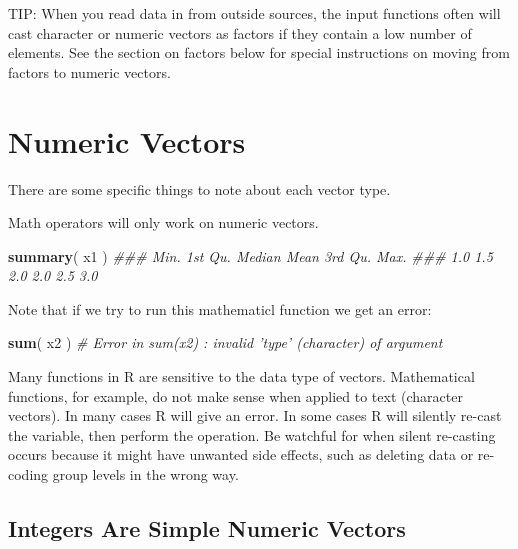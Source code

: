 \documentclass[]{book}
\newenvironment{Shaded}{\begin{snugshade}}{\end{snugshade}}
\newcommand{\CommentTok}[1]{\textcolor[rgb]{0.56,0.35,0.01}{\textit{#1}}}
\newcommand{\KeywordTok}[1]{\textcolor[rgb]{0.13,0.29,0.53}{\textbf{#1}}}
\newcommand{\NormalTok}[1]{#1}
\theoremstyle{definition}
\theoremstyle{definition}
\theoremstyle{definition}
\theoremstyle{remark}
\begin{document}
TIP: When you read data in from outside sources, the input functions
often will cast character or numeric vectors as factors if they contain
a low number of elements. See the section on factors below for special
instructions on moving from factors to numeric vectors.

\hypertarget{numeric-vectors}{%
\section{Numeric Vectors}\label{numeric-vectors}}

There are some specific things to note about each vector type.

Math operators will only work on numeric vectors.

\begin{Shaded}
\begin{Highlighting}[]

\KeywordTok{summary}\NormalTok{( x1 )}
\CommentTok{###    Min. 1st Qu.  Median    Mean 3rd Qu.    Max. }
\CommentTok{###     1.0     1.5     2.0     2.0     2.5     3.0}
\end{Highlighting}
\end{Shaded}

Note that if we try to run this mathematicl function we get an error:

\begin{Shaded}
\begin{Highlighting}[]

\KeywordTok{sum}\NormalTok{( x2 ) }\CommentTok{# Error in sum(x2) : invalid 'type' (character) of argument}
\end{Highlighting}
\end{Shaded}

Many functions in R are sensitive to the data type of vectors.
Mathematical functions, for example, do not make sense when applied to
text (character vectors). In many cases R will give an error. In some
cases R will silently re-cast the variable, then perform the operation.
Be watchful for when silent re-casting occurs because it might have
unwanted side effects, such as deleting data or re-coding group levels
in the wrong way.

\hypertarget{integers-are-simple-numeric-vectors}{%
\subsection{Integers Are Simple Numeric
Vectors}\label{integers-are-simple-numeric-vectors}}
\end{document}
